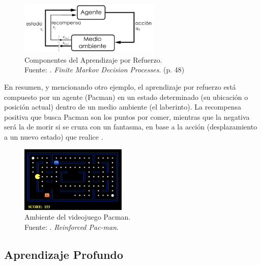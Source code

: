 \begin{itemize}
	\begin{figure}[h]
		\begin{center}
			\includegraphics[width=0.60\textwidth]{2/figures/aprendizaje_refuerzo.jpg}
			\caption[Componentes del Aprendizaje por Refuerzo]{Componentes del Aprendizaje por Refuerzo.\\
				Fuente: \cite{bk_sutton2018rl}. \textit{Finite Markov Decision Processes}. (p. 48)}
			\label{2:fig4}
		\end{center}
	\end{figure}
	
	En resumen, y mencionando otro ejemplo, el aprendizaje por refuerzo está compuesto por un agente (Pacman) en un estado determinado (su ubicación o posición actual) dentro de un medio ambiente (el laberinto). La recompensa positiva que busca Pacman son los puntos por comer, mientras que la negativa será la de morir si se cruza con un fantasma, en base a la acción (desplazamiento a un nuevo estado) que realice \parencite{tec_merino2019aprendrefuerzo}.
	
	\begin{figure}[h]
		\begin{center}
			\includegraphics[width=0.45\textwidth]{2/figures/pacman.png}
			\caption[Ambiente del videojuego Pacman]{Ambiente del videojuego Pacman.\\
				Fuente: . \textit{Reinforced Pac-man}.}
			\label{2:fig4_1}
		\end{center}
	\end{figure}
	
\end{itemize}

\clearpage

\subsection{Aprendizaje Profundo}

